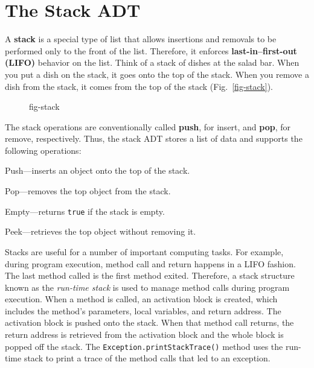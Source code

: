 \section{The Stack ADT}

\noindent A {\bf stack} is a special type of list that 
allows insertions and
removals to be performed only to the front of the list.  Therefore, it enforces {\bf
last-in--first-out (LIFO)} behavior 
on the list.  Think of a stack of
dishes at the salad bar.
When you put a dish on the stack, it goes onto the top of the stack.
When you remove a dish from the stack, it comes from the top of the
stack  (Fig.~\ref{fig-stack}).  

\begin{figure}[thb]
 {fig-stack}
\end{figure}

The stack operations are conventionally called {\bf push},
for insert, and {\bf pop}, for remove, respectively.  Thus,
the stack ADT stores a list of data and supports the following
operations:

\begin{BL}
\item  Push---inserts an object onto the top of the stack.
\item  Pop---removes the top object from the stack.
\item  Empty---returns {\tt true} if the stack is empty.
\item  Peek---retrieves the top object without removing it.
\end{BL}

Stacks are useful for a number of important computing tasks.  For
 example, during program execution,
method call and return happens in a LIFO fashion.  The last method
called is the first method exited.  Therefore, a stack structure known
as the {\em run-time stack} is used to manage method calls during
program execution.  When a method is called, an activation block is
created, which includes the method's parameters, local variables, and
return address.  The activation block is pushed onto the stack.  When
that method call returns, the return address is retrieved from the
activation block and the whole block is popped off the stack.  The
{\tt Exception.printStackTrace()} method uses the run-time stack to
print a trace of the method calls that led to an exception.


